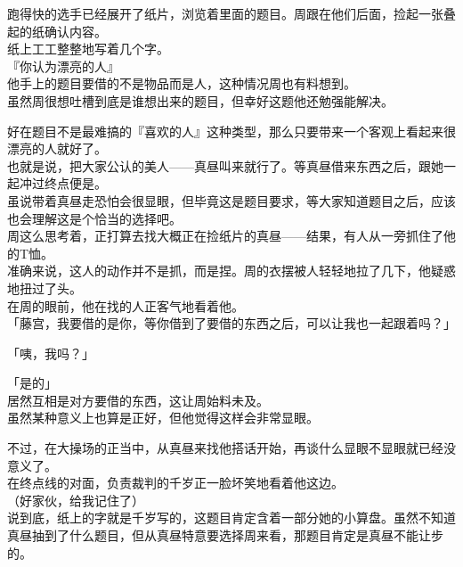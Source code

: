 跑得快的选手已经展开了纸片，浏览着里面的题目。周跟在他们后面，捡起一张叠起的纸确认内容。\\

纸上工工整整地写着几个字。\\

『你认为漂亮的人』\\

他手上的题目要借的不是物品而是人，这种情况周也有料想到。\\

虽然周很想吐槽到底是谁想出来的题目，但幸好这题他还勉强能解决。

好在题目不是最难搞的『喜欢的人』这种类型，那么只要带来一个客观上看起来很漂亮的人就好了。\\

也就是说，把大家公认的美人——真昼叫来就行了。等真昼借来东西之后，跟她一起冲过终点便是。\\

虽说带着真昼走恐怕会很显眼，但毕竟这是题目要求，等大家知道题目之后，应该也会理解这是个恰当的选择吧。\\

周这么思考着，正打算去找大概正在捡纸片的真昼——结果，有人从一旁抓住了他的T恤。\\

准确来说，这人的动作并不是抓，而是捏。周的衣摆被人轻轻地拉了几下，他疑惑地扭过了头。\\

在周的眼前，他在找的人正客气地看着他。\\

「藤宫，我要借的是你，等你借到了要借的东西之后，可以让我也一起跟着吗？」

「咦，我吗？」

「是的」\\

居然互相是对方要借的东西，这让周始料未及。\\

虽然某种意义上也算是正好，但他觉得这样会非常显眼。

不过，在大操场的正当中，从真昼来找他搭话开始，再谈什么显眼不显眼就已经没意义了。\\

在终点线的对面，负责裁判的千岁正一脸坏笑地看着他这边。\\

（好家伙，给我记住了）\\

说到底，纸上的字就是千岁写的，这题目肯定含着一部分她的小算盘。虽然不知道真昼抽到了什么题目，但从真昼特意要选择周来看，那题目肯定是真昼不能让步的。\\


